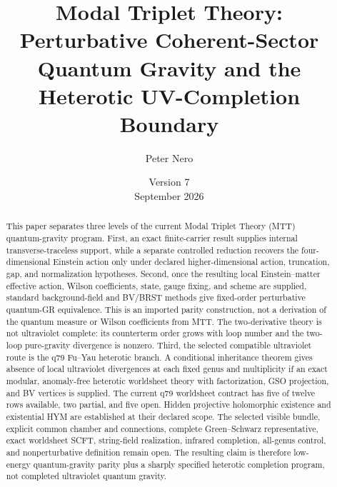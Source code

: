 \documentclass[11pt]{article}
\title{Modal Triplet Theory: Perturbative Coherent-Sector Quantum Gravity and the Heterotic UV-Completion Boundary}
\author{Peter Nero}
\date{Version 7\\September 2026}
\begin{document}
\maketitle

\begin{abstract}
This paper separates three levels of the current Modal Triplet Theory (MTT)
quantum-gravity program. First, an exact finite-carrier result supplies
internal transverse-traceless support, while a separate controlled reduction
recovers the four-dimensional Einstein action only under declared
higher-dimensional action, truncation, gap, and normalization hypotheses.
Second, once the resulting local Einstein--matter effective action, Wilson
coefficients, state, gauge fixing, and scheme are supplied, standard
background-field and BV/BRST methods give fixed-order perturbative quantum-GR
equivalence. This is an imported parity construction, not a derivation of the
quantum measure or Wilson coefficients from MTT. The two-derivative theory is
not ultraviolet complete: its counterterm order grows with loop number and
the two-loop pure-gravity divergence is nonzero. Third, the selected
compatible ultraviolet route is the q79 Fu--Yau heterotic branch. A
conditional inheritance theorem gives absence of local ultraviolet
divergences at each fixed genus and multiplicity if an exact modular,
anomaly-free heterotic worldsheet theory with factorization, GSO projection,
and BV vertices is supplied. The current q79 worldsheet contract has five of
twelve rows available, two partial, and five open. Hidden projective
holomorphic existence and existential HYM are established at their declared
scope. The selected visible bundle, explicit common chamber and connections,
complete Green--Schwarz representative, exact
worldsheet SCFT, string-field realization, infrared completion, all-genus
control, and nonperturbative definition remain open. The resulting claim is
therefore low-energy quantum-gravity parity plus a sharply specified
heterotic completion program, not completed ultraviolet quantum gravity.
\end{abstract}
\end{document}
